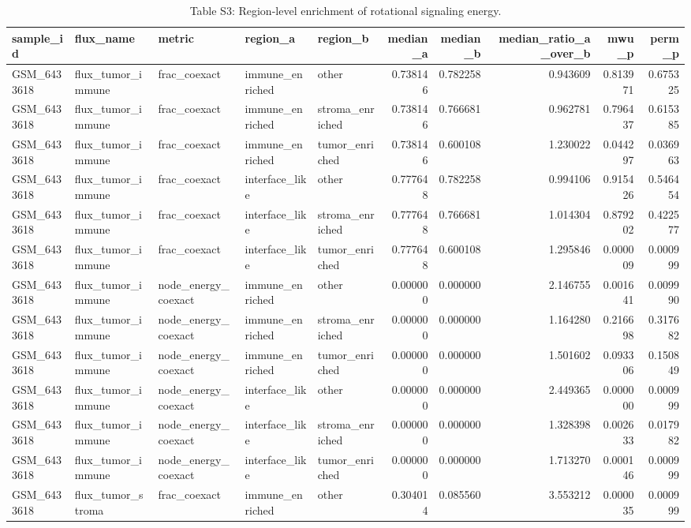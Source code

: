\begin{table}
\caption{Table S3: Region-level enrichment of rotational signaling energy.}
\label{tab:tnbc_region_enrichment}
\begin{tabular}{lllllrrrrr}
\toprule
sample_id & flux_name & metric & region_a & region_b & median_a & median_b & median_ratio_a_over_b & mwu_p & perm_p \\
\midrule
GSM_6433618 & flux_tumor_immune & frac_coexact & immune_enriched & other & 0.738146 & 0.782258 & 0.943609 & 0.813971 & 0.675325 \\
GSM_6433618 & flux_tumor_immune & frac_coexact & immune_enriched & stroma_enriched & 0.738146 & 0.766681 & 0.962781 & 0.796437 & 0.615385 \\
GSM_6433618 & flux_tumor_immune & frac_coexact & immune_enriched & tumor_enriched & 0.738146 & 0.600108 & 1.230022 & 0.044297 & 0.036963 \\
GSM_6433618 & flux_tumor_immune & frac_coexact & interface_like & other & 0.777648 & 0.782258 & 0.994106 & 0.915426 & 0.546454 \\
GSM_6433618 & flux_tumor_immune & frac_coexact & interface_like & stroma_enriched & 0.777648 & 0.766681 & 1.014304 & 0.879202 & 0.422577 \\
GSM_6433618 & flux_tumor_immune & frac_coexact & interface_like & tumor_enriched & 0.777648 & 0.600108 & 1.295846 & 0.000009 & 0.000999 \\
GSM_6433618 & flux_tumor_immune & node_energy_coexact & immune_enriched & other & 0.000000 & 0.000000 & 2.146755 & 0.001641 & 0.009990 \\
GSM_6433618 & flux_tumor_immune & node_energy_coexact & immune_enriched & stroma_enriched & 0.000000 & 0.000000 & 1.164280 & 0.216698 & 0.317682 \\
GSM_6433618 & flux_tumor_immune & node_energy_coexact & immune_enriched & tumor_enriched & 0.000000 & 0.000000 & 1.501602 & 0.093306 & 0.150849 \\
GSM_6433618 & flux_tumor_immune & node_energy_coexact & interface_like & other & 0.000000 & 0.000000 & 2.449365 & 0.000000 & 0.000999 \\
GSM_6433618 & flux_tumor_immune & node_energy_coexact & interface_like & stroma_enriched & 0.000000 & 0.000000 & 1.328398 & 0.002633 & 0.017982 \\
GSM_6433618 & flux_tumor_immune & node_energy_coexact & interface_like & tumor_enriched & 0.000000 & 0.000000 & 1.713270 & 0.000146 & 0.000999 \\
GSM_6433618 & flux_tumor_stroma & frac_coexact & immune_enriched & other & 0.304014 & 0.085560 & 3.553212 & 0.000035 & 0.000999 \\

\end{tabular}
\end{table}
